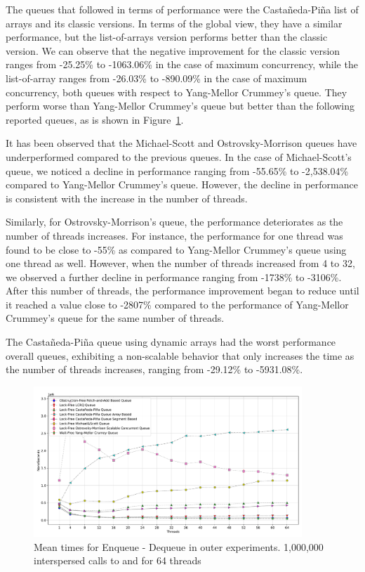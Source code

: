 The queues that followed in terms of performance were the Castañeda-Piña list of arrays and its classic versions. In terms of the global view, they have a similar performance, but the list-of-arrays version performs better than the classic version. We can observe that the negative improvement for the classic version ranges from -25.25\% to -1063.06\% in the case of maximum concurrency, while the list-of-array ranges from -26.03\% to -890.09\% in the case of maximum concurrency, both queues with respect to Yang-Mellor Crummey's queue. They perform worse than Yang-Mellor Crummey's queue but better than the following reported queues, as is shown in Figure~\ref{fig:64-outer--enq-deq}.

%


It has been observed that the Michael-Scott and Ostrovsky-Morrison queues have underperformed compared to the previous queues. In the case of Michael-Scott's queue, we noticed a decline in performance ranging from -55.65\% to -2,538.04\% compared to Yang-Mellor Crummey's queue. However, the decline in performance is consistent with the increase in the number of threads.

Similarly, for Ostrovsky-Morrison's queue, the performance deteriorates as the number of threads increases. For instance, the performance for one thread was found to be close to -55\% as compared to Yang-Mellor Crummey's queue using one thread as well. However, when the number of threads increased from 4 to 32, we observed a further decline in performance ranging from -1738\% to -3106\%. After this number of threads, the performance improvement began to reduce until it reached a value close to -2807\% compared to the performance of Yang-Mellor Crummey's queue for the same number of threads.

The Castañeda-Piña queue using dynamic arrays had the worst performance overall queues, exhibiting a non-scalable behavior that only increases the time as the number of threads increases, ranging from -29.12\% to -5931.08\%.

\begin{figure}[ht]
  \centering
  \includegraphics[width=0.9\textwidth]{contents/figures/V_64_outer_enq_deq_all.pdf}
  \caption{\label{fig:64-outer--enq-deq} Mean times for Enqueue - Dequeue in outer experiments. 1,000,000 interspersed calls to \Enq and \Deq  for 64 threads}
\end{figure}

